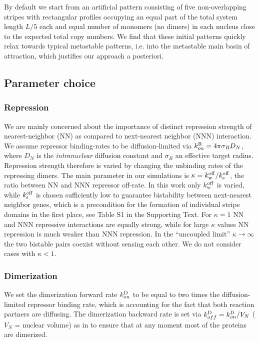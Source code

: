 \documentclass[a4paper,10pt]{article}
\newcommand{\kRon}{k^{\rm R}_{on}}
\newcommand{\kRoffS}{k_{\rm s}^{\rm off}}
\newcommand{\kRoffW}{k_{\rm w}^{\rm off}}
\newcommand{\kDon}{k^{\rm D}_{on}}
\newcommand{\kDoff}{k^{\rm D}_{off}}
\newcommand{\SI}{Supporting Text\xspace}
\begin{document}
By default we start from an artificial pattern consisting of five non-overlapping stripes with rectangular profiles
occupying an equal part of the total system length $L/5$ each and equal number of monomers (no dimers) in each nucleus
close to the expected total copy numbers.
We find that these initial patterns quickly relax towards typical metastable patterns, i.e. into the metastable main basin of attraction,
which justifies our approach a posteriori.


\subsection*{Parameter choice}

\subsubsection*{Repression}
We are mainly concerned about the importance of distinct repression strength of nearest-neighbor (NN)
as compared to next-nearest neighbor (NNN) interaction.
We assume repressor binding-rates to be diffusion-limited via $\kRon=4\pi\sigma_R D_N$,
where $D_N$ is the \emph{intranuclear} diffusion constant and $\sigma_R$ an effective target radius.
Repression strength therefore is varied by changing the unbinding rates of the repressing dimers.
The main parameter in our simulations is $\kappa=\kRoffW/\kRoffS$, the ratio between NN and NNN repressor off-rate.
In this work only $\kRoffW$ is varied, while $\kRoffS$ is chosen sufficiently low to guarantee bistability between next-nearest neighbor genes,
which is a precondition for the formation of individual stripe domains in the first place, see Table S1 in the \SI.
For $\kappa=1$ NN and NNN repressive interactions are equally strong,
while for large $\kappa$ values NN repression is much weaker than NNN repression.
In the ``uncoupled limit'' $\kappa\rightarrow\infty$ the two bistable pairs coexist without sensing each other.
We do not consider cases with $\kappa<1$.

\subsubsection*{Dimerization}
We set the dimerization forward rate $\kDon$ to be equal to two times the diffusion-limited repressor binding rate,
which is accounting for the fact that both reaction partners are diffusing.
The dimerization backward rate is set via $\kDoff=\kDon/V_N$ ($V_N$ = nuclear volume) as in \cite{Warren2004,Warren2005,Morelli2008,Sokolowski2012}
to ensure that at any moment most of the proteins are dimerized.
\end{document}
